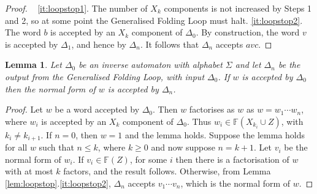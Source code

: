 \documentclass[a4paper,12pt]{article}
\renewcommand{\a}{\alpha }
\renewcommand{\b}{\beta }
\newcommand{\g}{\gamma }
\newcommand{\D}{\Delta }
\renewcommand{\d}{\delta }
\renewcommand{\L}{\Lambda }
\renewcommand{\S}{\Sigma }
\newtheorem{lemma}[theorem]{Lemma}
\numberwithin{equation}{section}
\numberwithin{figure}{section}
\newcommand{\FF}{\ensuremath{\mathbb{F}}}
\begin{document}
\begin{proof}
~
\ref{it:loopstop1}. The number of $X_k$ components is not
increased by Steps 1 and 2, so at some point the Generalised Folding 
Loop must halt.
\noindent \ref{it:loopstop2}. The word $b$ is accepted by an $X_k$
component of $\D_0$. By construction, the word $v$ is accepted by
$\D_1$, and hence by $\D_n$. It follows that $\D_n$ accepts $avc$.
\end{proof}
\begin{lemma}\label{lem:nfacc}
Let $\D_0$ be an inverse automaton with alphabet $\S$ and let
$\D_n$ be the output from the Generalised Folding Loop, with input $\D_0$. If $w$ is
accepted by $\D_0$ then the normal form of $w$ is accepted by $\D_n$.
\end{lemma}
\begin{proof}
Let $w$ be a word accepted by $\D_0$. Then $w$ factorises as  $w$
as $w=w_1\cdots w_n$, where $w_i$ is accepted by an $X_k$
component of $\D_0$. Thus $w_i\in \FF(X_{k_i}\cup Z)$, with $k_i\neq
k_{i+1}$. If $n=0$, then $w=1$ and the lemma holds. Suppose the
lemma holds for all $w$ such that $n\le k$, where $k\ge 0$ and now
suppose $n=k+1$. Let $v_i$ be the normal form of $w_i$. If $v_i\in
\FF(Z)$, for some $i$ then there is a factorisation of $w$ with at
most $k$ factors, and the result follows. Otherwise, from Lemma
\ref{lem:loopstop}.\ref{it:loopstop2},  $\D_n$ accepts $v_1\cdots
v_n$, which is the normal form of $w$.

\end{proof}
\end{document}
